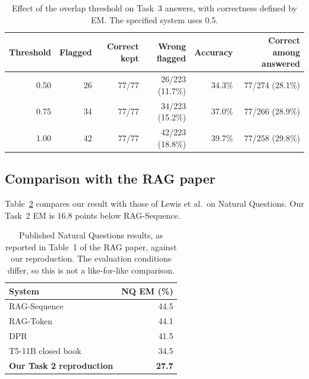 \documentclass[11pt,a4paper]{article}
\begin{document}
\begin{table}[ht]
\centering
\begin{tabular}{@{}rrrrrr@{}}
\toprule
Threshold & Flagged & Correct kept & Wrong flagged & Accuracy & Correct among answered \\
\midrule
0.50 & 26 & 77/77 & 26/223 (11.7\%) & 34.3\% & 77/274 (28.1\%) \\
0.75 & 34 & 77/77 & 34/223 (15.2\%) & 37.0\% & 77/266 (28.9\%) \\
1.00 & 42 & 77/77 & 42/223 (18.8\%) & 39.7\% & 77/258 (29.8\%) \\
\bottomrule
\end{tabular}
\caption{Effect of the overlap threshold on Task~3 answers, with correctness defined by EM. The specified system uses 0.5.}
\label{tab:thresholds}
\end{table}

\subsection{Comparison with the RAG paper}
Table~\ref{tab:paper} compares our result with those of Lewis et al.\ on Natural Questions. Our Task~2 EM is 16.8 points below RAG-Sequence.

\begin{table}[ht]
\centering
\begin{tabular}{@{}lr@{}}
\toprule
System & NQ EM (\%) \\
\midrule
RAG-Sequence~\cite{rag} & 44.5 \\
RAG-Token~\cite{rag} & 44.1 \\
DPR~\cite{rag,dpr} & 41.5 \\
T5-11B closed book~\cite{rag} & 34.5 \\
\midrule
\textbf{Our Task 2 reproduction} & \textbf{27.7} \\
\bottomrule
\end{tabular}
\caption{Published Natural Questions results, as reported in Table~1 of the RAG paper, against our reproduction. The evaluation conditions differ, so this is not a like-for-like comparison.}
\label{tab:paper}
\end{table}
\end{document}
